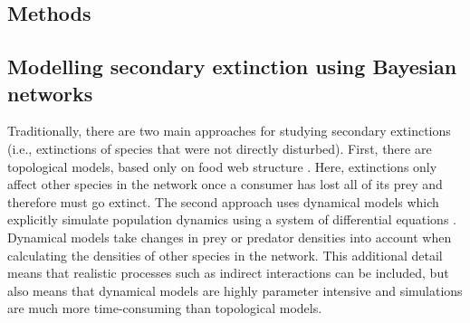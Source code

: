 \documentclass[12pt]{article}
\begin{document}
\begin{spacing}{2.0}

    



\section*{Methods}

    \subsection*{Modelling secondary extinction using Bayesian networks}

        Traditionally, there are two main approaches for studying secondary extinctions (i.e., extinctions of species that were not directly disturbed). First, there are topological models, based only on food web structure \citep{dunne2009cascading}. Here, extinctions only affect other species in the network once a consumer has lost all of its prey and therefore must go extinct. 
        The second approach uses dynamical models which explicitly simulate population dynamics using a system of differential equations \citep{binzer2011susceptibility}. Dynamical models take changes in prey or predator densities into account when calculating the densities of other species in the network. 
        This additional detail means that realistic processes such as indirect interactions can be included, but also means that dynamical models are highly parameter intensive and simulations are much more time-consuming than topological models. 
        

\end{spacing}
\end{document}
